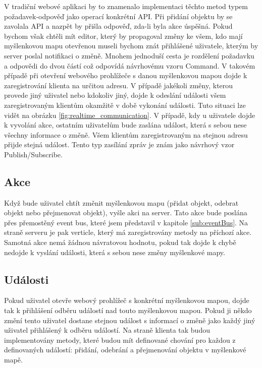 V tradiční webové aplikaci by to znamenalo implementaci těchto metod typem požadavek-odpověď jako operací konkrétní API. Při přidání objektu by se zavolala API a nazpět by přišla odpověď, zda-li byla akce úspěšná. Pokud bychom však chtěli mít editor, který by propagoval změny ke všem, kdo mají myšlenkovou mapu otevřenou museli bychom znát přihlášené uživatele, kterým by server poslal notifikaci o změně. Mnohem jednoduší cesta je rozdělení požadavku a odpovědi do dvou částí což odpovídá návrhovému vzoru Command. V takovém případě při otevření webového prohlížeče s danou myšlenkovou mapou dojde k zaregistrování klienta na určitou adresu. V případě jakékoli změny, kterou provede jiný uživatel nebo kdokoliv jiný, dojde k odeslání události všem zaregistrovaným klientům okamžitě v době vykonání události. Tuto situaci lze vidět na obrázku \ref{fig:realtime_communication}. V případě, kdy u uživatele dojde k vyvolání akce, ostatním uživatelům bude zaslána událost, která s sebou nese všechny informace o změně. Všem klientům zaregistrovaným na stejnou adresu přijde stejná událost. Tento typ zasílání zpráv je znám jako návrhový vzor Publish/Subscribe.

\subsection{Akce}

Když bude uživatel chtít změnit myšlenkovou mapu (přidat objekt, odebrat objekt nebo přejmenovat objekt), vyšle akci na server. Tato akce bude poslána přes přemostěný event bus, které jsem představil v kapitole \ref{sub:eventBus}. Na straně serveru je pak verticle, který má zaregistrovány metody na příchozí akce. Samotná akce nemá žádnou návratovou hodnotu, pokud tak dojde k chybě nedojde k vyslání události, která s sebou nese změny myšlenkové mapy.

\subsection{Události}

Pokud uživatel otevře webový prohlížeč s konkrétní myšlenkovou mapou, dojde tak k přihlášení odběru událostí nad touto myšlenkovou mapou. Pokud ji někdo změní tento uživatel dostane stejnou událost s informací o změně jako každý jiný uživatel přihlášený k odběru událostí.
Na straně klienta tak budou implementovány metody, které budou mít definované chování pro každou z definovaných událostí: přidání, odebrání a přejmenování objektu v myšlenkové mapě.

